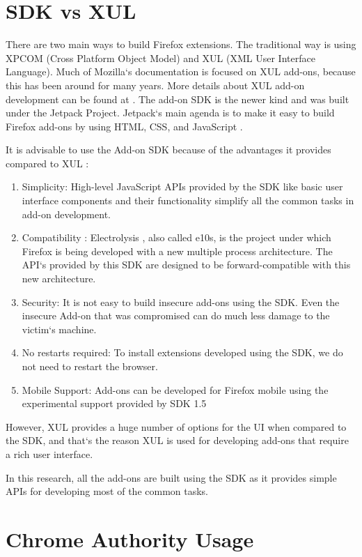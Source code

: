 \section{SDK vs XUL} 

There are two main ways to build Firefox extensions. The traditional way is using XPCOM (Cross Platform Object Model) and XUL (XML User Interface Language). Much of Mozilla`s documentation is focused on XUL add-ons, because this has been around for many years. More details about XUL add-on development can be found at \cite{bib32}. The add-on SDK is the newer kind and was built under the Jetpack Project. Jetpack`s main agenda is to make it easy to build Firefox add-ons by using HTML, CSS, and JavaScript \cite{bib3}.

It is advisable to use the Add-on SDK because of the advantages it provides compared to XUL \cite{bib33}:

\begin{enumerate}
\item Simplicity: High-level JavaScript APIs provided by the SDK like basic user interface components and their functionality simplify all the common tasks in add-on development. 
\item Compatibility : Electrolysis \cite{bib31}, also called e10s, is the project under which Firefox is being developed with a new multiple process architecture. The API`s provided by this SDK are designed to be forward-compatible with this new architecture. 
\item Security: It is not easy to build insecure add-ons using the SDK. Even the insecure Add-on that was compromised can do much less damage to the victim`s machine.
\item No restarts required: To install extensions developed using the SDK, we do not need to restart the browser.
\item Mobile Support: Add-ons can be developed for Firefox mobile using the experimental support provided by SDK 1.5
\end{enumerate}

However, XUL provides a huge number of options for the UI when compared to the SDK, and that`s the reason XUL is used for developing add-ons that require a rich user interface.

In this research, all the add-ons are built using the SDK as it provides simple APIs for developing most of the common tasks.

\section{Chrome Authority Usage}

